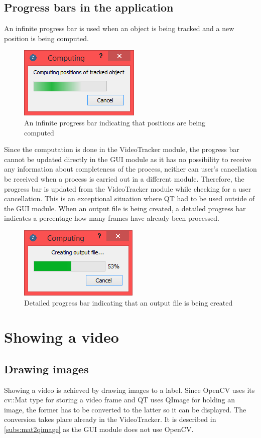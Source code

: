 \subsection{Progress bars in the application}
An infinite progress bar is used when an object is being tracked and a new position is being computed.
\begin{figure}[!htbp]
\centering
\includegraphics{png/progress_bar_infinite}
\caption{An infinite progress bar indicating that positions are being computed}
\label{fig:progress_bar_infinite}
\end{figure}
Since the computation is done in the VideoTracker module, the progress bar cannot be updated directly in the GUI module as it has no possibility to receive any information about completeness of the process, neither can user's cancellation be received when a process is carried out in a different module. Therefore, the progress bar is updated from the VideoTracker module while checking for a user cancellation. This is an exceptional situation where QT had to be used outside of the GUI module. When an output file is being created, a detailed progress bar indicates a percentage how many frames have already been processed.
\begin{figure}[!htbp]
\centering
\includegraphics{png/progress_bar_detailed}
\caption{Detailed progress bar indicating that an output file is being created}
\label{fig:progress_bar_detailed}
\end{figure}

\section{Showing a video}
\subsection{Drawing images}\label{subs:mat2qimage}
Showing a video is achieved by drawing images to a label. Since OpenCV uses its cv::Mat type for storing a video frame and QT uses QImage for holding an image, the former has to be converted to the latter so it can be displayed. The conversion takes place already in the VideoTracker. It is described in \autoref{subs:mat2qimage} as the GUI module does not use OpenCV.

